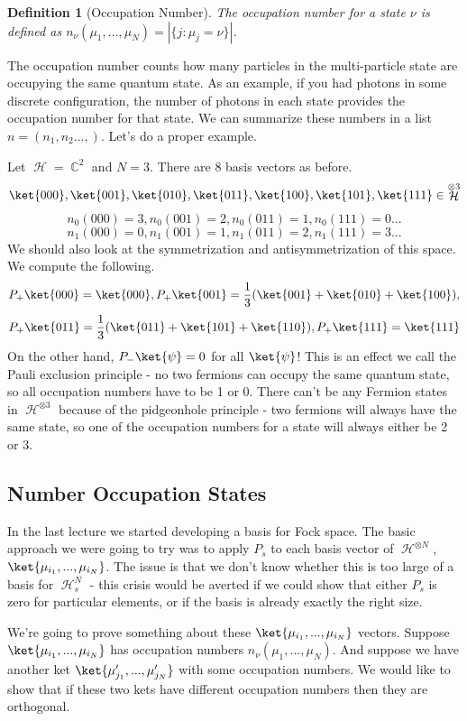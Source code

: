 \documentclass{article}
\DeclareMathOperator{\Hh}{{\mathcal{H}}}
\DeclareMathOperator{\CC}{\mathbb{C}}
\newtheorem{defn}{Definition}
\begin{document}
\begin{defn}[Occupation Number] The occupation number for a state $\nu$ is defined as $n_\nu(\mu_1,...,\mu_N) = |\{j:\mu_j=\nu\}|$.\end{defn} 

The occupation number counts how many particles in the multi-particle state are occupying the same quantum state. As an example, if you had photons in some discrete configuration, the number of photons in each state provides the occupation number for that state. We can summarize these numbers in a list $n = (n_1,n_2...,)$. Let's do a proper example.

Let $\Hh = \CC^2$ and $N = 3$. There are 8 basis vectors as before. 
\[\ket{000},\ket{001},\ket{010},\ket{011},\ket{100},\ket{101},\ket{111}\in \Hh^{\otimes 3}\]
\[n_0(000)=3, n_0 (001)=2, n_0(011) = 1, n_0 (111)=0 ...\]
\[n_1(000)=0, n_1(001) = 1, n_1(011) = 2, n_1(111) = 3 ...\]
We should also look at the symmetrization and antisymmetrization of this space. We compute the following.
\[P_+\ket{000}=\ket{000}, P_+\ket{001}=\frac{1}{3}(\ket{001}+\ket{010}+\ket{100}), \]\[P_+\ket{011}=\frac{1}{3}(\ket{011}+\ket{101}+\ket{110}), P_+\ket{111}=\ket{111} \]
On the other hand, $P_-\ket{\psi}=0$ for all $\ket{\psi}$! This is an effect we call the Pauli exclusion principle - no two fermions can occupy the same quantum state, so all occupation numbers have to be 1 or 0. There can't be any Fermion states in $\Hh^{\otimes 3}$ because of the pidgeonhole principle - two fermions will always have the same state, so one of the occupation numbers for a state will always either be 2 or 3.

\subsection{Number Occupation States}
In the last lecture we started developing a basis for Fock space. The basic approach we were going to try was to apply $P_s$ to each basis vector of $\Hh^{\otimes N}$, $\ket{\mu_{i_1},...,\mu_{i_N}}$. The issue is that we don't know whether this is too large of a basis for $\Hh_s^N$ - this crisis would be averted if we could show that either $P_s$ is zero for particular elements, or if the basis is already exactly the right size. 

We're going to prove something about these $\ket{\mu_{i_1},...,\mu_{i_N}}$ vectors. Suppose $\ket{\mu_{i_1},...,\mu_{i_N}}$ has occupation numbers $n_\nu(\mu_1,...,\mu_N)$. And suppose we have another ket $\ket{\mu'_{j_1},...,\mu'_{j_N}}$ with some occupation numbers. We would like to show that if these two kets have different occupation numbers then they are orthogonal.
\end{document}
